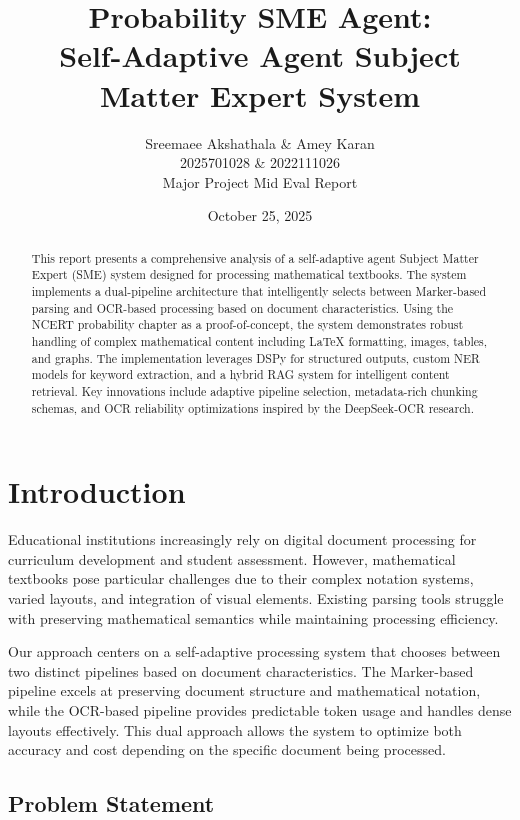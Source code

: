 \documentclass[12pt]{article}
\title{\textbf{Probability SME Agent:\\
Self-Adaptive Agent Subject Matter Expert System}}
\author{Sreemaee Akshathala \& Amey Karan \\ 
2025701028 \& 2022111026\\
Major Project Mid Eval Report}
\date{October 25, 2025}
\begin{document}
\maketitle

\begin{abstract}
This report presents a comprehensive analysis of a self-adaptive agent Subject Matter Expert (SME) system designed for processing mathematical textbooks. The system implements a dual-pipeline architecture that intelligently selects between Marker-based parsing and OCR-based processing based on document characteristics. Using the NCERT probability chapter as a proof-of-concept, the system demonstrates robust handling of complex mathematical content including LaTeX formatting, images, tables, and graphs. The implementation leverages DSPy for structured outputs, custom NER models for keyword extraction, and a hybrid RAG system for intelligent content retrieval. Key innovations include adaptive pipeline selection, metadata-rich chunking schemas, and OCR reliability optimizations inspired by the DeepSeek-OCR research.
\end{abstract}

\tableofcontents
\newpage

\section{Introduction}

Educational institutions increasingly rely on digital document processing for curriculum development and student assessment. However, mathematical textbooks pose particular challenges due to their complex notation systems, varied layouts, and integration of visual elements. Existing parsing tools struggle with preserving mathematical semantics while maintaining processing efficiency.

Our approach centers on a self-adaptive processing system that chooses between two distinct pipelines based on document characteristics. The Marker-based pipeline excels at preserving document structure and mathematical notation, while the OCR-based pipeline provides predictable token usage and handles dense layouts effectively. This dual approach allows the system to optimize both accuracy and cost depending on the specific document being processed.

\subsection{Problem Statement}
\end{document}
